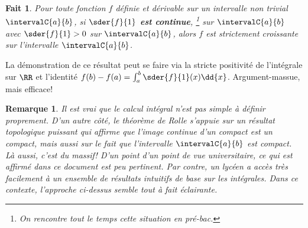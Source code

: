 \documentclass[12pt]{amsart}
\newtheorem{fact}{Fait}
\newtheorem*{remark*}{Remarque}
\begin{document}
\begin{fact}
    Pour toute fonction $f$ définie et dérivable sur un intervalle non trivial $\intervalC{a}{b}$,
    si \textbf{$\sder{f}{1}$ est continue},%
    \footnote{
        On rencontre tout le temps cette situation en pré-bac.
    }
    sur $\intervalC{a}{b}$ avec $\sder{f}{1} > 0$ sur $\intervalC{a}{b}$,
    alors $f$ est strictement croissante sur l'intervalle $\intervalC{a}{b}$.
\end{fact}

La démonstration de ce résultat peut se faire via la stricte positivité de l'intégrale sur $\RR$ et l'identité $f(b) - f(a) = \int_a^b \sder{f}{1}(x) \dd{x}$. Argument-massue, mais efficace!


\begin{remark*}
    Il est vrai que le calcul intégral n'est pas simple à définir proprement.
    D'un autre côté, le théorème de Rolle s'appuie sur un résultat topologique puissant qui affirme que l'image continue d'un compact est un compact, mais aussi sur le fait que l'intervalle $\intervalC{a}{b}$ est compact. Là aussi, c'est du massif!
    D'un point d'un point de vue universitaire, ce qui est affirmé dans ce document est peu pertinent.
    Par contre, un lycéen a accès très facilement à un ensemble de résultats intuitifs de base sur les intégrales. Dans ce contexte, l'approche ci-dessus semble tout à fait éclairante.
\end{remark*}
\end{document}
